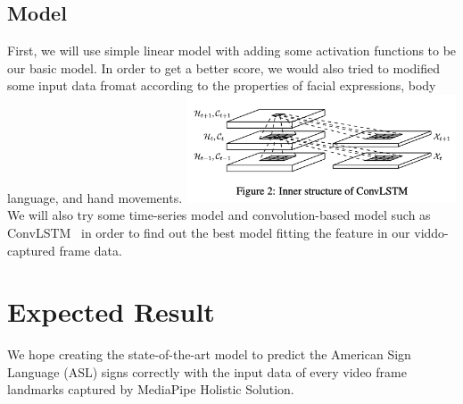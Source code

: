 \documentclass[10pt,twocolumn,letterpaper]{article}
\begin{document}
\begin{CJK*}{UTF8}{bsmi}
\subsection{Model}
First, we will use simple linear model with adding some activation functions to be our basic model.
In order to get a better score, we would also tried to modified some input data fromat according to the properties of facial expressions, body language, and hand movements.
\includegraphics[width=80mm]{ConvLSTM}
We will also try some time-series model and convolution-based model such as ConvLSTM~\cite{NIPS2015_07563a3f} in order to find out the best model fitting the feature in our viddo-captured frame data.


\section{Expected Result}
We hope creating the state-of-the-art model to predict the American Sign Language (ASL) signs correctly
with the input data of every video frame landmarks captured by MediaPipe Holistic Solution.




{\small


}

\end{CJK*}
\end{document}
